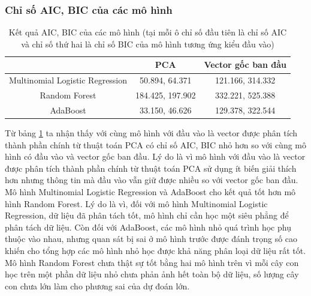 \subsubsection{Chỉ số AIC, BIC của các mô hình}

\begin{table}[h!]
    \centering
    \begin{tabular}{|c|c|c|}
        \hline
        & PCA & Vector gốc ban đầu \\
        \hline
        Multinomial Logistic Regression & 50.894, 64.371 & 121.166, 314.332 \\
        \hline
        Random Forest & 184.425, 197.902 & 332.221, 525.388 \\
        \hline
        AdaBoost & 33.150, 46.626 & 129.378, 322.544 \\
        \hline
    \end{tabular}
    \caption{Kết quả AIC, BIC của các mô hình (tại mỗi ô chỉ số đầu tiên là chỉ số AIC và chỉ số thứ hai là chỉ số BIC của mô hình tương ứng kiểu đầu vào)}
    \label{tab:Non_null_AIC_BIC_Model_pseudo_clustering_label}
\end{table}

Từ bảng \ref{tab:Non_null_AIC_BIC_Model_pseudo_clustering_label} ta nhận thấy với cùng mô hình với đầu vào là vector được phân tích thành phần chính từ thuật toán PCA có chỉ số AIC, BIC nhỏ hơn so với cùng mô hình có đầu vào và vector gốc ban đầu.
Lý do là vì mô hình với đầu vào là vector được phân tích thành phần chính từ thuật toán PCA sử dụng ít biến giải thích hơn nhưng thông tin mà đầu vào vẫn giữ được nhiều so với vector gốc ban đầu.
Mô hình Multinomial Logistic Regression và AdaBoost cho kết quả tốt hơn mô hình Random Forest.
Lý do là vì, đối với mô hình Multinomial Logistic Regression, dữ liệu đã phân tách tốt, mô hình chỉ cần học một siêu phẳng để phân tách dữ liệu.
Còn đối với AdaBoost, các mô hình nhỏ quá trình học phụ thuộc vào nhau, nhưng quan sát bị sai ở mô hình trước được đánh trọng số cao khiến cho tổng hợp các mô hình nhỏ học được khả năng phân loại dữ liệu rất tốt.
Mô hình Random Forest chưa thật sự tốt bằng hai mô hình trên vì mỗi cây con học trên một phần dữ liệu nhỏ chưa phản ảnh hết toàn bộ dữ liệu, số lượng cây con chưa lớn làm cho phương sai của dự đoán lớn.

